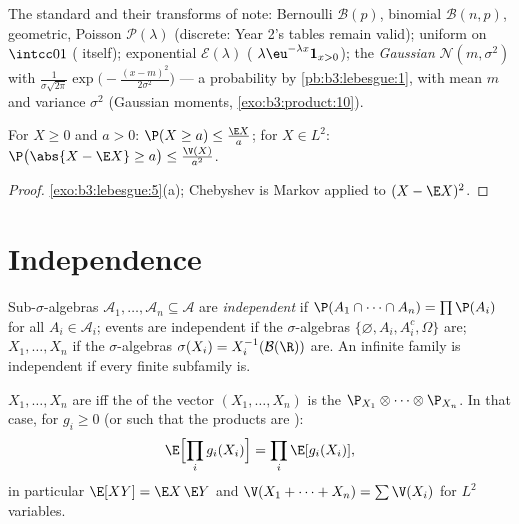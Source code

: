 \begin{example}\label{ex:b3:probability:laws}
The standard  and their transforms of note: Bernoulli
$\mathcal B(p)$, binomial $\mathcal B(n, p)$, geometric,
Poisson $\mathcal P(\lambda)$ (discrete: Year 2's tables
remain valid); uniform on $\intcc01$ (
itself); exponential $\mathcal E(\lambda)$ (
$\lambda\eu^{-\lambda x}\mathbf 1_{x>0}$); the
\emph{Gaussian} $\mathcal N(m, \sigma^2)$
with  $\frac1{\sigma\sqrt{2\pi}}\exp\bigl(-\frac{(x -
m)^2}{2\sigma^2}\bigr)$ --- a probability  by
\cref{pb:b3:lebesgue:1}, with mean $m$ and variance
$\sigma^2$ (Gaussian moments, \cref{exo:b3:product:10}).
\end{example}

\begin{proposition}
\label{prop:b3:probability:markov}
For $X \geq 0$ and $a > 0$: $\P(X \geq a) \leq \frac{\E
X}{a}$; for $X \in L^2$: $\P\bigl(\abs{X - \E X} \geq
a\bigr) \leq \frac{\V(X)}{a^2}$.
\end{proposition}

\begin{proof}
\cref{exo:b3:lebesgue:5}(a); Chebyshev is Markov applied to
$(X - \E X)^2$.
\end{proof}

\section{Independence}

\begin{definition}\label{def:b3:probability:independence}
Sub-$\sigma$-algebras $\mathcal A_1, \dots, \mathcal A_n
\subseteq \mathcal A$ are \emph{independent}
if $\P(A_1\cap\dots\cap A_n) = \prod\P(A_i)$ for all $A_i \in
\mathcal A_i$; events are independent if the $\sigma$-algebras
$\{\varnothing, A_i, A_i^c, \Omega\}$ are; 
$X_1, \dots, X_n$ if the $\sigma$-algebras $\sigma(X_i) =
X_i^{-1}(\mathcal B(\R))$ are. An infinite family is
independent if every finite subfamily is.
\end{definition}

\begin{theorem}\label{thm:b3:probability:independence}
$X_1, \dots, X_n$ are  iff the  of the vector
$(X_1, \dots, X_n)$ is the 
$\P_{X_1}\otimes\cdots\otimes\P_{X_n}$. In that case, for
$g_i \geq 0$ (or such that the products are ):
\[
\E\Bigl[\prod_ig_i(X_i)\Bigr] = \prod_i\E[g_i(X_i)],
\]
in particular $\E[XY] = \E X\,\E Y$ and $\V(X_1 + \dots +
X_n) = \sum\V(X_i)$ for  $L^2$ variables.
\end{theorem}

